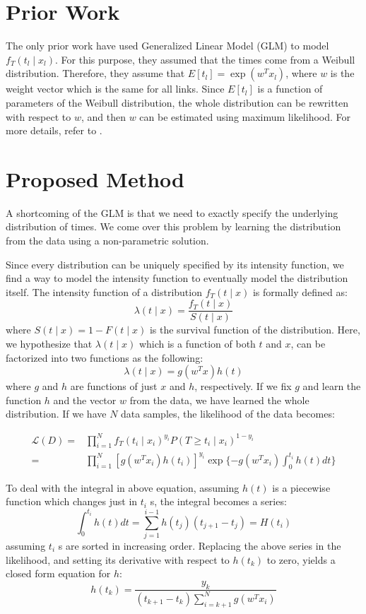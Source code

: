 \documentclass[]{article}
\begin{document}
\section{Prior Work}
The only prior work have used Generalized Linear Model (GLM) to model $f_T(t_l\mid x_l)$. For this purpose, they assumed that the times come from a Weibull distribution. Therefore, they assume that $E[t_l]=\exp(w^Tx_l)$, where $w$ is the weight vector which is the same for all links. Since $E[t_l]$ is a function of parameters of the Weibull distribution, the whole distribution can be rewritten with respect to $w$, and then $w$ can be estimated using maximum likelihood. For more details, refer to \cite{sun2012will}.

\section{Proposed Method}
A shortcoming of the GLM is that we need to exactly specify the underlying distribution of times. We come over this problem by learning the distribution from the data using a non-parametric solution.

Since every distribution can be uniquely specified by its intensity function, we find a way to model the intensity function to eventually model the distribution itself. The intensity function of a distribution $f_T(t\mid x)$ is formally defined as:
\[\lambda(t\mid x)=\frac{f_T(t\mid x)}{S(t\mid x)} \]
where $S(t\mid x)=1-F(t\mid x)$ is the survival function of the distribution. Here, we hypothesize that $\lambda(t\mid x)$ which is a function of both $t$ and $x$, can be factorized into two functions as the following:
\[\lambda(t\mid x)=g(w^Tx)h(t)\]
where $g$ and $h$ are functions of just $x$ and $h$, respectively. If we fix $g$ and learn the function $h$ and the vector $w$ from the data, we have learned the whole distribution. If we have $N$ data samples, the likelihood of the data becomes:

\begin{equation*}
\begin{split}
\mathcal{L}(D)=&\prod_{i=1}^{N}f_T(t_i\mid x_i)^{y_i}P(T\ge t_i\mid x_i)^{1-y_i}\\
=&\prod_{i=1}^{N}\left[g(w^Tx_i)h(t_i)\right]^{y_i}\exp\lbrace-g(w^Tx_i)\int_{0}^{t_i}h(t)dt\rbrace
\end{split}
\end{equation*}

To deal with the integral in above equation, assuming $h(t)$ is a piecewise function which changes just in $t_i$ s, the integral becomes a series:
\[\int_{0}^{t_i}h(t)dt = \sum_{j=1}^{i-1}h(t_j)(t_{j+1}-t_j)=H(t_i)\]
assuming $t_i$ s are sorted in increasing order. Replacing the above series in the likelihood, and setting its derivative with respect to $h(t_k)$ to zero, yields a closed form equation for $h$:
\[h(t_k)=\frac{y_k}{(t_{k+1}-t_k)\sum_{i=k+1}^{N}g(w^Tx_i)}\]
\end{document}
